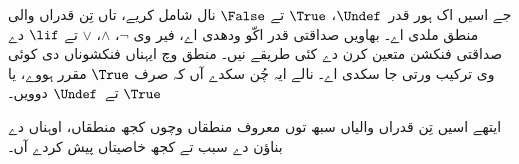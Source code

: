 \documentclass[../../../include/open-logic-section]{subfiles}
\begin{document}


جے اسیں اک ہور قدر~$\Undef$، $\True$ تے $\False$ نال
شامل کریے، تاں تِن قدراں والی منطق ملدی اے۔ بھاویں صداقتی
قدر اکّو ودھدی اے، فیر وی $\lnot$، $\land$، $\lor$ تے $\lif$
دے صداقتی فنکشن متعین کرن دے کئی طریقے نیں۔ منطق وچ ایہناں
فنکشوناں دی کوئی وی ترکیب ورتی جا سکدی اے۔ نالے ایہ چُن سکدے
آں کہ صرف $\True$ مقرر ہووے، یا $\True$ تے~$\Undef$ دوویں۔

ایتھے اسیں تِن قدراں والیاں سبھ توں معروف منطقاں وچوں کجھ
منطقاں، اوہناں دے بناؤن دے سبب تے کجھ خاصیتاں پیش کردے آں۔
\end{document}
